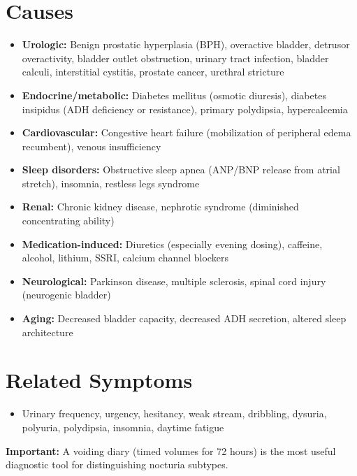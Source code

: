 \section*{Causes}
\begin{itemize}
  \item \textbf{Urologic:} Benign prostatic hyperplasia (BPH), overactive bladder, detrusor overactivity, bladder outlet obstruction, urinary tract infection, bladder calculi, interstitial cystitis, prostate cancer, urethral stricture
  \item \textbf{Endocrine/metabolic:} Diabetes mellitus (osmotic diuresis), diabetes insipidus (ADH deficiency or resistance), primary polydipsia, hypercalcemia
  \item \textbf{Cardiovascular:} Congestive heart failure (mobilization of peripheral edema recumbent), venous insufficiency
  \item \textbf{Sleep disorders:} Obstructive sleep apnea (ANP/BNP release from atrial stretch), insomnia, restless legs syndrome
  \item \textbf{Renal:} Chronic kidney disease, nephrotic syndrome (diminished concentrating ability)
  \item \textbf{Medication-induced:} Diuretics (especially evening dosing), caffeine, alcohol, lithium, SSRI, calcium channel blockers
  \item \textbf{Neurological:} Parkinson disease, multiple sclerosis, spinal cord injury (neurogenic bladder)
  \item \textbf{Aging:} Decreased bladder capacity, decreased ADH secretion, altered sleep architecture
\end{itemize}

\section*{Related Symptoms}
\begin{itemize}
  \item Urinary frequency, urgency, hesitancy, weak stream, dribbling, dysuria, polyuria, polydipsia, insomnia, daytime fatigue
\end{itemize}
\textbf{Important:} A voiding diary (timed volumes for 72 hours) is the most useful diagnostic tool for distinguishing nocturia subtypes.

